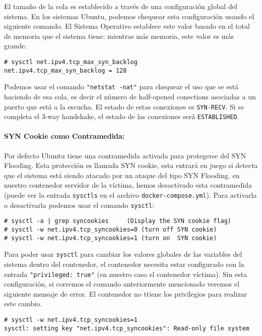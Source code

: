 El tamaño de la cola es establecido a través de una configuración global del sistema. En los sistemas Ubuntu, podemos chequear esta configuración usando el siguiente comando. El Sistema Operativo establece este valor basado en el total de memoria que el sistema tiene: mientras más memoria, este valor es más grande.

\begin{lstlisting}
# sysctl net.ipv4.tcp_max_syn_backlog
net.ipv4.tcp_max_syn_backlog = 128
\end{lstlisting}

Podemos usar el comando \texttt{"netstat -nat"} para chequear el uso que se está haciendo de esa cola, es decir el número de half-opened conections asociadas a un puerto que está a la escucha.
El estado de estas conexiones es \texttt {SYN-RECV}. Si se completa el 3-way handshake, el estado de las conexiones será {\tt ESTABLISHED}.


\paragraph{SYN Cookie como Contramedida:}
Por defecto Ubuntu tiene una contramedida activada para protegerse del SYN Flooding. Esta protección es llamada SYN cookie, esta entrará en juego si detecta que el sistema está siendo atacado por un ataque del tipo SYN Flooding.
en nuestro contenedor servidor de la víctima, hemos desactivado esta contramedida (puede ver la entrada \texttt{sysctls} en el archivo \texttt{docker-compose.yml}).
Para activarla o desactivarla podemos usar el comando \texttt{sysctl}:

\begin{lstlisting}
# sysctl -a | grep syncookies     (Display the SYN cookie flag) 
# sysctl -w net.ipv4.tcp_syncookies=0 (turn off SYN cookie)
# sysctl -w net.ipv4.tcp_syncookies=1 (turn on  SYN cookie)
\end{lstlisting}

Para poder usar \texttt{sysctl} para cambiar los valores globales de las variables del sistema dentro del contenedor, el contenedor necesita estar configurado con la entrada \texttt{"privileged: true"} (en nuestro caso el contenedor víctima).
Sin esta configuración, si corremos el comando anteriormente mencionado veremos el siguiente mensaje de error. El contenedor no ttiene los privilegios para realizar este cambio.

\begin{lstlisting}
# sysctl -w net.ipv4.tcp_syncookies=1
sysctl: setting key "net.ipv4.tcp_syncookies": Read-only file system
\end{lstlisting}





